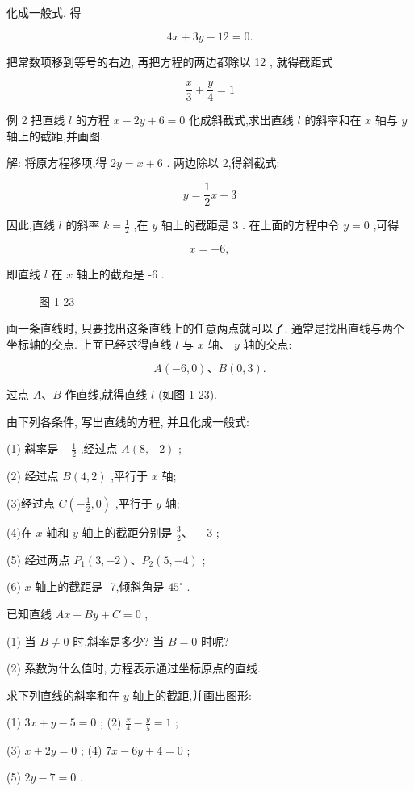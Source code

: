 \documentclass[lang=cn,newtx,12pt,scheme=chinese]{elegantbook}
\begin{document}
化成一般式, 得

\[
    {4x} + {3y} - {12} = 0.
\]

把常数项移到等号的右边, 再把方程的两边都除以 12 , 就得截距式

\[
  \frac{x}{3} + \frac{y}{4} = 1
\]

例 2 把直线 \(l\) 的方程 \(x - {2y} + 6 = 0\) 化成斜截式,求出直线 \(l\) 的斜率和在 \(x\) 轴与 \(y\) 轴上的截距,并画图.

解: 将原方程移项,得 \({2y} = x + 6\) . 两边除以 2,得斜截式:

\[
  y = \frac{1}{2}x + 3
\]

因此,直线 \(l\) 的斜率 \(k = \frac{1}{2}\) ,在 \(y\) 轴上的截距是 3 . 在上面的方程中令 \(y = 0\) ,可得

\[
  x = - 6,
\]

即直线 \(l\) 在 \(x\) 轴上的截距是 -6 .

\begin{figure}[h]
  \centering
  
  \caption{图 1-23}
\end{figure}

画一条直线时, 只要找出这条直线上的任意两点就可以了. 通常是找出直线与两个坐标轴的交点. 上面已经求得直线 \(l\) 与 \(x\) 轴、 \(y\) 轴的交点:

\[
  A\left( {-6,0}\right) \text{、}B\left( {0,3}\right) \text{.}
\]

过点 \(A\text{、}B\) 作直线,就得直线 \(l\) (如图 1-23).

\begin{problemset}[练习]

\item 由下列各条件, 写出直线的方程, 并且化成一般式:

(1) 斜率是 \(- \frac{1}{2}\) ,经过点 \(A\left( {8, - 2}\right)\) ;

(2) 经过点 \(B\left( {4,2}\right)\) ,平行于 \(x\) 轴;

(3)经过点 \(C\left( {-\frac{1}{2},0}\right)\) ,平行于 \(y\) 轴;

(4)在 \(x\) 轴和 \(y\) 轴上的截距分别是 \(\frac{3}{2}\text{、} - 3\) ;

(5) 经过两点 \({P}_{1}\left( {3, - 2}\right) \text{、}{P}_{2}\left( {5, - 4}\right)\) ;

(6) \(x\) 轴上的截距是 -7,倾斜角是 \({45}^{ \circ }\) .

\item 已知直线 \({Ax} + {By} + C = 0\) ,

(1) 当 \(B \neq 0\) 时,斜率是多少? 当 \(B = 0\) 时呢?

(2) 系数为什么值时, 方程表示通过坐标原点的直线.

\item 求下列直线的斜率和在 \(y\) 轴上的截距,并画出图形:

(1) \({3x} + y - 5 = 0\) ; (2) \(\frac{x}{4} - \frac{y}{5} = 1\) ;

(3) \(x + {2y} = 0\) ; (4) \({7x} - {6y} + 4 = 0\) ;

(5) \({2y} - 7 = 0\) .

\end{problemset}
\end{document}
